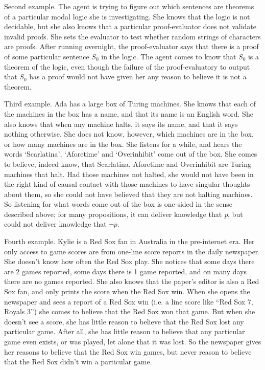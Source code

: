 Second example. The agent is trying to figure out which sentences are theorems of a particular modal logic she is investigating. She knows that the logic is not decidable, but she also knows that a particular proof-evaluator does not validate invalid proofs. She sets the evaluator to test whether random strings of characters are proofs. After running overnight, the proof-evaluator says that there is a proof of some particular sentence $S_0$ in the logic. The agent comes to know that $S_0$ is a theorem of the logic, even though the failure of the proof-evaluatory to output that $S_0$ has a proof would not have given her any reason to believe it is not a theorem.

Third example. \gls{Ada} has a large box of Turing machines. She knows that each of the machines in the box has a name, and that its name is an English word. She also knows that when any machine halts, it says its name, and that it says nothing otherwise. She does not know, however, which machines are in the box, or how many machines are in the box. She listens for a while, and hears the words `Scarlatina', `Aforetime' and `Overinhibit' come out of the box. She comes to believe, indeed know, that Scarlatina, Aforetime and Overinhibit are Turing machines that halt. Had those machines not halted, she would not have been in the right kind of causal contact with those machines to have singular thoughts about them, so she could not have believed that they are not halting machines. So listening for what words come out of the box is one-sided in the sense described above; for many propositions, it can deliver knowledge that \emph{p}, but could not deliver knowledge that $\neg p$.

Fourth example. \gls{Kylie} is a Red Sox fan in Australia in the pre-internet era. Her only access to game scores are from one-line score reports in the daily newspaper. She doesn't know how often the Red Sox play. She notices that some days there are 2 games reported, some days there is 1 game reported, and on many days there are no games reported. She also knows that the paper's editor is also a Red Sox fan, and only prints the score when the Red Sox win. When she opens the newspaper and sees a report of a Red Sox win (i.e. a line score like ``Red Sox 7, Royals 3'') she comes to believe that the Red Sox won that game. But when she doesn't see a score, she has little reason to believe that the Red Sox lost any particular game. After all, she has little reason to believe that any particular game even exists, or was played, let alone that it was lost. So the newspaper gives her reasons to believe that the Red Sox win games, but never reason to believe that the Red Sox didn't win a particular game.

